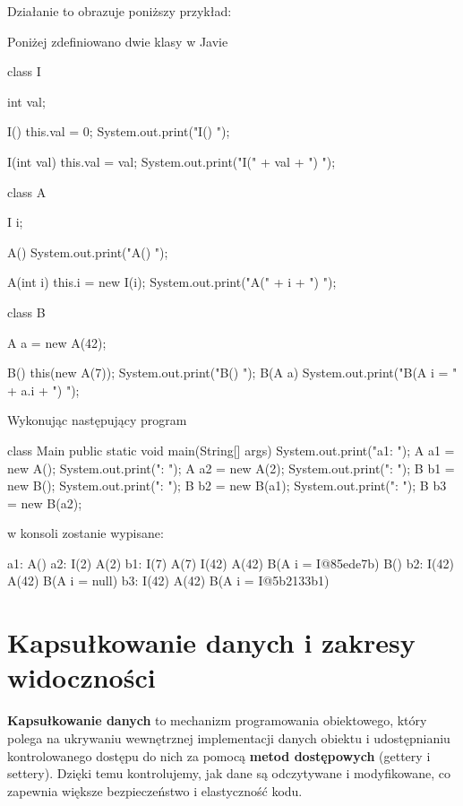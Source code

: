 Działanie to obrazuje poniższy przykład:
\begin{example}
Poniżej zdefiniowano dwie klasy w Javie
\begin{java}
class I {
    int val;

    I() {
        this.val = 0;
        System.out.print("I() ");
    }

    I(int val) {
        this.val = val;
        System.out.print("I(" + val + ") ");
    }
}

class A {
    I i;

    A() {
        System.out.print("A() ");
    }
    
    A(int i) {
        this.i = new I(i);
        System.out.print("A(" + i + ") ");
    }
}

class B {
    A a = new A(42);

    B() {
        this(new A(7));
        System.out.print("B() ");
    }
    B(A a) {
        System.out.print("B(A {i = " + a.i + "}) ");
    }
}
\end{java}

Wykonując następujący program
\begin{java}
class Main {
    public static void main(String[] args) {
        System.out.print("a1: ");
        A a1 = new A();
        System.out.print(": ");
        A a2 = new A(2);
        System.out.print(": ");
        B b1 = new B();
        System.out.print(": ");
        B b2 = new B(a1);
        System.out.print(": ");
        B b3 = new B(a2);
    }
}
\end{java}
w konsoli zostanie wypisane:
\begin{plain}
a1: A() 
a2: I(2) A(2) 
b1: I(7) A(7) I(42) A(42) B(A {i = I@85ede7b}) B() 
b2: I(42) A(42) B(A {i = null}) 
b3: I(42) A(42) B(A {i = I@5b2133b1})
\end{plain}
\end{example}

\section{Kapsułkowanie danych i zakresy widoczności}

\textbf{Kapsułkowanie danych} to mechanizm programowania obiektowego, który polega na ukrywaniu wewnętrznej implementacji danych obiektu i udostępnianiu kontrolowanego dostępu do nich za pomocą \textbf{metod dostępowych} (gettery i settery). Dzięki temu kontrolujemy, jak dane są odczytywane i modyfikowane, co zapewnia większe bezpieczeństwo i elastyczność kodu.

